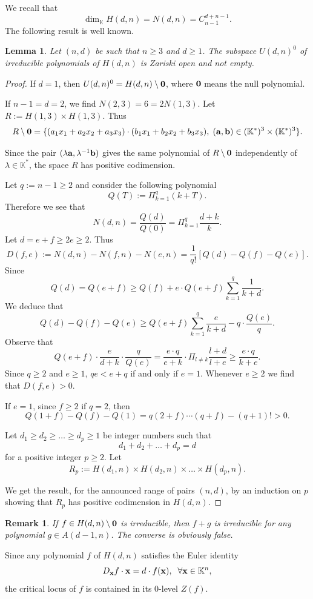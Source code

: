 \documentclass[11pt]{amsart}
\newtheorem{lemma}[theorem]{Lemma}
\newtheorem{remark}[theorem]{Remark}
\newcommand{\field}[1]{\mathbb{#1}}
\newcommand{\K}{\field{K}}
\newcommand{\ba}{{\bf a}}
\newcommand{\bb}{{\bf b}}
\newcommand{\bbo}{{\bf 0}}
\newcommand{\bx}{{\bf x}}
\newcommand{\Kn}{{\K^n}}
\newcommand{\lbd}{{\lambda}}
\numberwithin{equation}{section}
\numberwithin{equation}{section}
\begin{document}
\bigskip
We recall that
$$
\dim_\K H(d,n) = N(d,n) = C_{n-1}^{d+n-1}.
$$
The following result is well known.
%
%
\begin{lemma}
Let $(n,d)$ be such that $n\geq 3$ and $d\geq 1$.
The subspace $U(d,n)^0$ of irreducible polynomials of $H(d,n)$ is Zariski 
open and not empty.
\end{lemma}
%
%
\begin{proof}
If $d =1$, then $U(d,n)^0 = H(d,n)\setminus \bbo$, where $\bbo$ means the 
null polynomial. 

\medskip
If $n-1 = d = 2$, we find $N(2,3) = 6 = 2 N(1,3)$. 
Let $R := H(1,3) \times H(1,3)$. Thus 
$$
R \setminus \bbo = \{(a_1x_1+a_2x_2+a_3x_3)\cdot (b_1x_1 + b_2x_2 + b_3 x_3), 
\; (\ba,\bb)  \in (\K^*)^3\times (\K^*)^3\}.
$$

Since the pair $(\lbd \ba,\lbd^{-1}\bb)$ gives the same polynomial of 
$R\setminus \bbo$ independently of $\lbd\in \K^*$, the space $R$ has positive
codimension. 

\medskip
Let $q:=n-1 \geq 2$ and consider the following polynomial
$$
Q(T) := \Pi_{k=1}^{q}(k+T).
$$
Therefore we see that
$$
N(d,n) = \frac{Q(d)}{Q(0)} = \Pi_{k=1}^q \frac{d+k}{k}.
$$
Let $d = e + f \geq 2e \geq 2$. Thus 
$$
D(f,e) := N(d,n) -  N(f,n) - N(e,n) = \frac{1}{q!}[Q(d) - Q(f) - Q(e)].
$$
Since 
$$
Q(d) = Q(e+f) \geq  Q(f) + e \cdot Q(e+f)\sum_{k=1}^q\frac{1}{k+d} .
$$
We deduce that 
$$
Q(d) - Q(f) - Q(e) \geq Q(e+f) \sum_{k=1}^q \frac{e}{k+d} - q \cdot 
\frac{Q(e)}{q}. 
$$
Observe that 
$$
Q(e+f) \cdot \frac{e}{d+k} \cdot \frac{q}{Q(e)} = \frac{e\cdot q}{e+k}\cdot 
\Pi_{l\neq k} \frac{l+d}{l+e}  \geq \frac{e\cdot q}{k+e}. 
$$
Since $q \geq 2$ and $e\geq 1$, $qe < e+q$ if and only if $e=1$.   
Whenever $e\geq 2$ we find that $D(f,e) >0$.

If $e = 1$, since $f\geq 2$ if $q =2$, then
$$
Q(1+f) - Q(f) - Q(1) = q (2+f) \cdots (q+f) - (q+1)!  > 0.
$$

Let $d_1\geq d_2\geq \ldots \geq d_p \geq 1$ be integer numbers such that
$$
d_1 + d_2 + \ldots + d_p =d
$$
for a positive integer $p\geq 2$. Let 
$$
R_p := H(d_1,n) \times H(d_2,n) \times \ldots \times H(d_p,n).
$$

We get the result, for the announced range of pairs $(n,d)$, by an induction 
on $p$ showing that $R_p$ has positive codimension in $H(d,n)$.
\end{proof}
%
%
\begin{remark}
If $f \in H(d,n) \setminus \bbo$ is irreducible, then $f+g$ is irreducible 
for any polynomial $g\in A(d-1,n)$. The converse is 
obviously false. 
\end{remark}
%
%
Since any polynomial $f$ of $H(d,n)$ satisfies the Euler identity
$$
D_\bx f \cdot \bx = d \cdot f(\bx), \;\; \forall \bx \in \Kn,
$$
the critical locus of $f$ is contained in its $0$-level
$Z(f)$.
\end{document}
